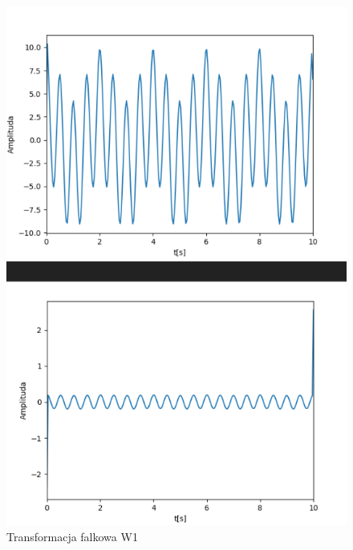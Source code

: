 \documentclass[12pt]{article}
\begin{document}
\begin{figure}[H]
\centering
\includegraphics[scale=0.6]{s1FalkaW1.png}
\caption{Transformacja falkowa  W1}
\end{figure}
\end{document}
